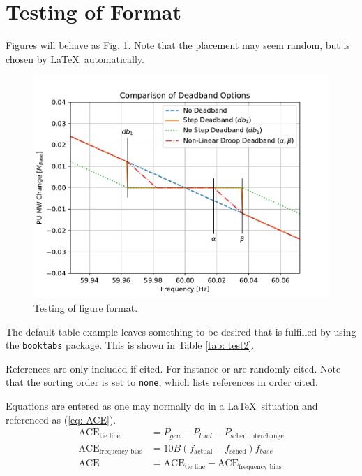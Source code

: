 \section{Testing of Format}

Figures will behave as Fig. \ref{fig: test}. Note that the placement may seem random, but is chosen by \LaTeX\ automatically.
\begin{figure}[!t]
\centering
\includegraphics[width=\linewidth]{figures/dbAction3}
\caption{Testing of figure format.}
\label{fig: test}
\end{figure}


The default table example leaves something to be desired that is fulfilled by using the \verb|booktabs| package.
This is shown in Table \ref{tab: test2}.


References are only included if cited. For instance \cite{Kundur} or \cite{DonnellyVoltageControl} are randomly cited. Note that the sorting order is set to \verb|none|, which lists references in order cited.

Equations are entered as one may normally do in a \LaTeX\ situation and referenced as (\ref{eq: ACE}).
\begin{align}
\text{ACE}_{\text{tie line}} &= P_{gen} - P_{load} - P_{\text{sched interchange}}\\ \label{eq: TLace}
\text{ACE}_{\text{frequency bias}} &= 10B(f_{\text{actual}}-f_{\text{sched}})f_{base}\\
\text{ACE} &= \text{ACE}_{\text{tie line}} -\text{ACE}_{\text{frequency bias}} \label{eq: ACE}
\end{align}